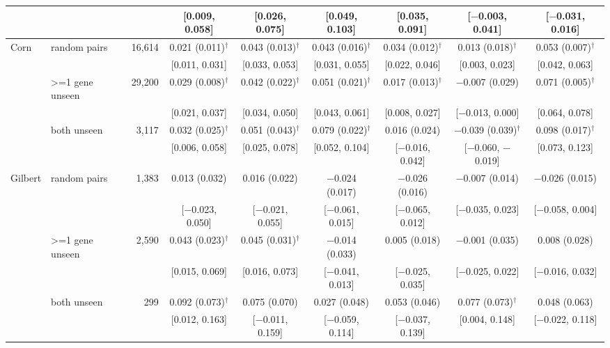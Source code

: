 \begin{tabular}{llr|cccccc}
 & & & \scriptsize[0.009, 0.058] & \scriptsize[0.026, 0.075] & \scriptsize[0.049, 0.103] & \scriptsize[0.035, 0.091] & \scriptsize[$-$0.003, 0.041] & \scriptsize[$-$0.031, 0.016] \\
\hline
Corn & random pairs & 16,614 & 0.021 (0.011)$^\dagger$ & 0.043 (0.013)$^\dagger$ & 0.043 (0.016)$^\dagger$ & 0.034 (0.012)$^\dagger$ & 0.013 (0.018)$^\dagger$ & 0.053 (0.007)$^\dagger$ \\
 & & & \scriptsize[0.011, 0.031] & \scriptsize[0.033, 0.053] & \scriptsize[0.031, 0.055] & \scriptsize[0.022, 0.046] & \scriptsize[0.003, 0.023] & \scriptsize[0.042, 0.063] \\
 & >=1 gene unseen & 29,200 & 0.029 (0.008)$^\dagger$ & 0.042 (0.022)$^\dagger$ & 0.051 (0.021)$^\dagger$ & 0.017 (0.013)$^\dagger$ & $-$0.007 (0.029) & 0.071 (0.005)$^\dagger$ \\
 & & & \scriptsize[0.021, 0.037] & \scriptsize[0.034, 0.050] & \scriptsize[0.043, 0.061] & \scriptsize[0.008, 0.027] & \scriptsize[$-$0.013, 0.000] & \scriptsize[0.064, 0.078] \\
 & both unseen & 3,117 & 0.032 (0.025)$^\dagger$ & 0.051 (0.043)$^\dagger$ & 0.079 (0.022)$^\dagger$ & 0.016 (0.024) & $-$0.039 (0.039)$^\dagger$ & 0.098 (0.017)$^\dagger$ \\
 & & & \scriptsize[0.006, 0.058] & \scriptsize[0.025, 0.078] & \scriptsize[0.052, 0.104] & \scriptsize[$-$0.016, 0.042] & \scriptsize[$-$0.060, $-$0.019] & \scriptsize[0.073, 0.123] \\
\hline
Gilbert & random pairs & 1,383 & 0.013 (0.032) & 0.016 (0.022) & $-$0.024 (0.017) & $-$0.026 (0.016) & $-$0.007 (0.014) & $-$0.026 (0.015) \\
 & & & \scriptsize[$-$0.023, 0.050] & \scriptsize[$-$0.021, 0.055] & \scriptsize[$-$0.061, 0.015] & \scriptsize[$-$0.065, 0.012] & \scriptsize[$-$0.035, 0.023] & \scriptsize[$-$0.058, 0.004] \\
 & >=1 gene unseen & 2,590 & 0.043 (0.023)$^\dagger$ & 0.045 (0.031)$^\dagger$ & $-$0.014 (0.033) & 0.005 (0.018) & $-$0.001 (0.035) & 0.008 (0.028) \\
 & & & \scriptsize[0.015, 0.069] & \scriptsize[0.016, 0.073] & \scriptsize[$-$0.041, 0.013] & \scriptsize[$-$0.025, 0.035] & \scriptsize[$-$0.025, 0.022] & \scriptsize[$-$0.016, 0.032] \\
 & both unseen & 299 & 0.092 (0.073)$^\dagger$ & 0.075 (0.070) & 0.027 (0.048) & 0.053 (0.046) & 0.077 (0.073)$^\dagger$ & 0.048 (0.063) \\
 & & & \scriptsize[0.012, 0.163] & \scriptsize[$-$0.011, 0.159] & \scriptsize[$-$0.059, 0.114] & \scriptsize[$-$0.037, 0.139] & \scriptsize[0.004, 0.148] & \scriptsize[$-$0.022, 0.118] \\
\hline
\end{tabular}
